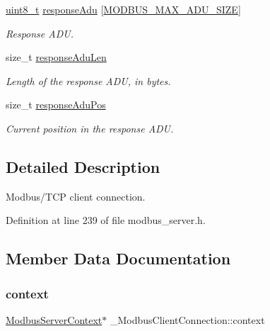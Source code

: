 \begin{DoxyCompactItemize}
\hyperlink{stdint_8h_aba7bc1797add20fe3efdf37ced1182c5}{uint8\+\_\+t} \hyperlink{struct__ModbusClientConnection_ada58ec2f39f9b8b4985068c7c33a99a1}{response\+Adu} \mbox{[}\hyperlink{modbus__common_8h_a2c01d2b429ca01511f3f6b8c63edfda8}{M\+O\+D\+B\+U\+S\+\_\+\+M\+A\+X\+\_\+\+A\+D\+U\+\_\+\+S\+I\+ZE}\mbox{]}
\begin{DoxyCompactList}\small\item\em Response A\+DU. \end{DoxyCompactList}\item 
size\+\_\+t \hyperlink{struct__ModbusClientConnection_ae5c09411ff402773e0f1eeee221cd0c4}{response\+Adu\+Len}
\begin{DoxyCompactList}\small\item\em Length of the response A\+DU, in bytes. \end{DoxyCompactList}\item 
size\+\_\+t \hyperlink{struct__ModbusClientConnection_a66e906bf0f7a1df8ce8f56e5ec04a154}{response\+Adu\+Pos}
\begin{DoxyCompactList}\small\item\em Current position in the response A\+DU. \end{DoxyCompactList}\end{DoxyCompactItemize}


\subsection{Detailed Description}
Modbus/\+T\+CP client connection. 

Definition at line 239 of file modbus\+\_\+server.\+h.



\subsection{Member Data Documentation}
\mbox{\label{struct__ModbusClientConnection_a4ab59255dccf72dd5fea9b2567260194}} 
\subsubsection{\texorpdfstring{context}{context}}
{\footnotesize\ttfamily \hyperlink{modbus__server_8h_a3a5f2957951349d3c053b1ebe94fe4f7}{Modbus\+Server\+Context}$\ast$ \+\_\+\+Modbus\+Client\+Connection\+::context}



